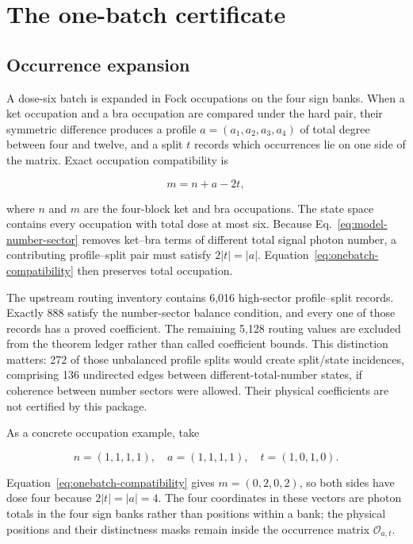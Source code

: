 \section{The one-batch certificate}
\label{sec:one-batch}

\subsection{Occurrence expansion}

A dose-six batch is expanded in Fock occupations on the four sign banks. When a ket occupation and a bra occupation are compared under the hard pair, their symmetric difference produces a profile $a=(a_1,a_2,a_3,a_4)$ of total degree between four and twelve, and a split $t$ records which occurrences lie on one side of the matrix. Exact occupation compatibility is

\begin{equation}
m=n+a-2t,
\label{eq:onebatch-compatibility}
\end{equation}

where $n$ and $m$ are the four-block ket and bra occupations. The state space contains every occupation with total dose at most six. Because Eq.~\eqref{eq:model-number-sector} removes ket--bra terms of different total signal photon number, a contributing profile--split pair must satisfy $2|t|=|a|$. Equation~\eqref{eq:onebatch-compatibility} then preserves total occupation.

The upstream routing inventory contains 6,016 high-sector profile--split records. Exactly 888 satisfy the number-sector balance condition, and every one of those records has a proved coefficient. The remaining 5,128 routing values are excluded from the theorem ledger rather than called coefficient bounds. This distinction matters: 272 of those unbalanced profile splits would create split/state incidences, comprising 136 undirected edges between different-total-number states, if coherence between number sectors were allowed. Their physical coefficients are not certified by this package.

As a concrete occupation example, take

\begin{equation}
n=(1,1,1,1),\quad
a=(1,1,1,1),\quad
t=(1,0,1,0).
\end{equation}

Equation~\eqref{eq:onebatch-compatibility} gives $m=(0,2,0,2)$, so both sides have dose four because $2|t|=|a|=4$. The four coordinates in these vectors are photon totals in the four sign banks rather than positions within a bank; the physical positions and their distinctness masks remain inside the occurrence matrix $\mathcal O_{a,t}$.

